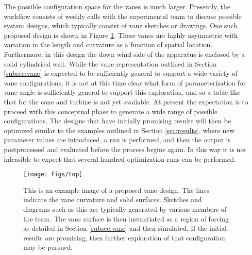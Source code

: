 The possible configuration space for the vanes is much larger. 
Presently, the workflow consists of weekly calls with the experimental
team to discuss possible system designs, which typically consist of vane
sketches or drawings. One such proposed design is shown in Figure
\ref{fig:sketch}.  These vanes are highly asymmetric with variation in
the length and curvature as a function of spatial location. Furthermore,
in this design the down wind side of the apparatus is enclosed by a
solid cylindrical wall.  While the vane representation outlined in
Section \ref{subsec:vane} is expected to be sufficiently general to support a
wide variety of vane configurations, it is not at this time clear what
form of parameterization for vane angle is sufficiently general to
support this exploration, and so a table like that for the cone and
turbine is not yet available. At present the expectation is to proceed
with this conceptual phase to generate a wide  range of possible
configurations. The designs that have initially promising results will
then be optimized similar to the examples outlined in Section
\ref{sec:results}, where new parameter values are 
introduced, a run is performed, and then the output is postprocessed and
evaluated before the process begins again. In this way it is not
infeasible to expect that several hundred optimization runs can be
performed. 

\begin{figure}[htb]
 \centering
 \texttt{[image: figs/top]}
 \caption{This is an example image of a proposed vane design. The lines
 indicate the vane curvature and solid surfaces. Sketches and diagrams
 such as this  are typically generated by various members of the
 team. The vane surface is then instantiated as a region of forcing as
 detailed in Section \ref{subsec:vane} and then simulated. If the
 initial results are promising, then further exploration of that
 configuration may be pursued.} 
 \label{fig:sketch}
\end{figure}




